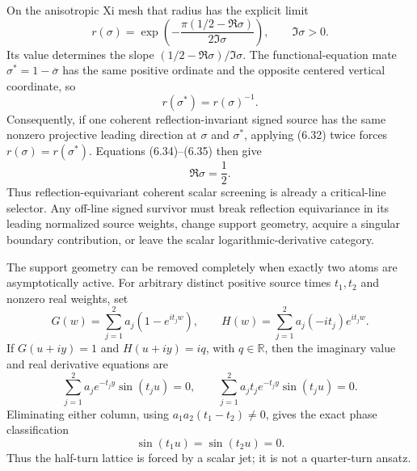 \documentclass[11pt]{article}
\theoremstyle{definition}
\theoremstyle{remark}
\newcommand{\R}{\mathbb R}
\begin{document}
On the anisotropic Xi mesh that radius has the explicit limit
\[
 r(\sigma)=
 \exp\!\left(
 -\frac{\pi(1/2-\Re\sigma)}{2\Im\sigma}
 \right),\qquad \Im\sigma>0.                           \tag{6.34}
\]
Its value determines the slope $(1/2-\Re\sigma)/\Im\sigma$.  The
functional-equation mate $\sigma^\ast=1-\overline{\sigma}$ has the same positive ordinate and
the opposite centered vertical coordinate, so
\[
 r(\sigma^\ast)=r(\sigma)^{-1}.                        \tag{6.35}
\]
Consequently, if one coherent reflection-invariant signed source has the same nonzero projective
leading direction at $\sigma$ and $\sigma^\ast$, applying (6.32) twice forces
$r(\sigma)=r(\sigma^\ast)$.  Equations (6.34)--(6.35) then give
\[
 \Re\sigma=\frac12.                                    \tag{6.36}
\]
Thus reflection-equivariant coherent scalar screening is already a critical-line selector.  Any
off-line signed survivor must break reflection equivariance in its leading normalized source
weights, change support geometry, acquire a singular boundary contribution, or leave the scalar
logarithmic-derivative category.

The support geometry can be removed completely when exactly two atoms are asymptotically active.
For arbitrary distinct positive source times $t_1,t_2$ and nonzero real weights, set
\[
 G(w)=\sum_{j=1}^2a_j(1-e^{it_jw}),\qquad
 H(w)=\sum_{j=1}^2a_j(-it_j)e^{it_jw}.                 \tag{6.37}
\]
If $G(u+iy)=1$ and $H(u+iy)=iq$, with $q\in\R$, then the imaginary value and real derivative
equations are
\[
 \sum_{j=1}^2a_je^{-t_jy}\sin(t_ju)=0,\qquad
 \sum_{j=1}^2a_jt_je^{-t_jy}\sin(t_ju)=0.
\]
Eliminating either column, using $a_1a_2(t_1-t_2)\ne0$, gives the exact phase classification
\[
 \sin(t_1u)=\sin(t_2u)=0.                              \tag{6.38}
\]
Thus the half-turn lattice is forced by a scalar jet; it is not a quarter-turn ansatz.
\end{document}
